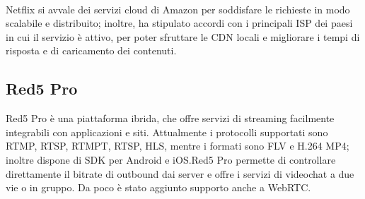 		\paragraph*{}
		Netflix si avvale dei servizi cloud di Amazon per soddisfare le richieste in modo scalabile e distribuito; inoltre, ha stipulato accordi con i principali \gls{ISP} dei paesi in cui il servizio è attivo, per poter sfruttare le \gls{CDN} locali e migliorare i tempi di risposta e di caricamento dei contenuti.
	
		\subsection{Red5 Pro}
		Red5 Pro è una piattaforma ibrida, che offre servizi di streaming facilmente integrabili con applicazioni e siti. Attualmente i protocolli supportati sono \gls{RTMP}, \gls{RTSP}, \gls{RTMPT}, \gls{RTSP}, \gls{HLS}, mentre i formati sono FLV e H.264 MP4; inoltre dispone di \gls{SDK} per Android e iOS.\@ Red5 Pro permette di controllare direttamente il bitrate di outbound dai server e offre i servizi di videochat a due vie o in gruppo. Da poco è stato aggiunto supporto anche a WebRTC.\@
	
